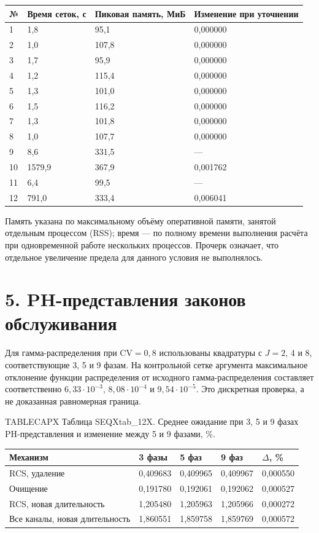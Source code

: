 \setlength{\tabcolsep}{2pt}
\begin{tabular}{p{0.94cm}p{4.25cm}p{4.72cm}p{5.67cm}}
\toprule
№ & Время сеток, с & Пиковая память, МиБ & Изменение при уточнении \\
\midrule
1 & 1,8 & 95,1 & 0,000000 \\
2 & 1,0 & 107,8 & 0,000000 \\
3 & 1,7 & 95,9 & 0,000000 \\
4 & 1,2 & 115,4 & 0,000000 \\
5 & 1,3 & 101,0 & 0,000000 \\
6 & 1,5 & 116,2 & 0,000000 \\
7 & 1,3 & 101,8 & 0,000000 \\
8 & 1,0 & 107,7 & 0,000000 \\
9 & 8,6 & 331,5 & — \\
10 & 1579,9 & 367,9 & 0,001762 \\
11 & 6,4 & 99,5 & — \\
12 & 791,0 & 333,4 & 0,006041 \\
\bottomrule
\end{tabular}




Память указана по максимальному объёму оперативной памяти, занятой отдельным процессом (RSS); время --- по полному времени выполнения расчёта при одновременной работе нескольких процессов. Прочерк означает, что отдельное увеличение предела для данного условия не выполнялось.

\section*{5. PH-представления законов обслуживания}
Для гамма-распределения при \(\mathrm{CV}=0{,}8\) использованы квадратуры с \(J=2\), 4 и 8, соответствующие 3, 5 и 9 фазам. На контрольной сетке аргумента максимальное отклонение функции распределения от исходного гамма-распределения составляет соответственно \(6{,}33\cdot10^{-3}\), \(8{,}08\cdot10^{-4}\) и \(9{,}54\cdot10^{-5}\). Это дискретная проверка, а не доказанная равномерная граница.

\noindent TABLECAPX Таблица SEQXtab_12X. Среднее ожидание при 3, 5 и 9 фазах PH-представления и изменение между 5 и 9 фазами, \%.\par

\setlength{\tabcolsep}{2pt}
\begin{tabular}{p{5.76cm}p{2.55cm}p{2.55cm}p{2.55cm}p{2.17cm}}
\toprule
Механизм & 3 фазы & 5 фаз & 9 фаз & $\Delta$, \% \\
\midrule
RCS, удаление & 0,409683 & 0,409965 & 0,409967 & 0,000550 \\
Очищение & 0,191780 & 0,192061 & 0,192062 & 0,000527 \\
RCS, новая длительность & 1,205480 & 1,205963 & 1,205966 & 0,000272 \\
Все каналы, новая длительность & 1,860551 & 1,859758 & 1,859769 & 0,000572 \\
\bottomrule
\end{tabular}




